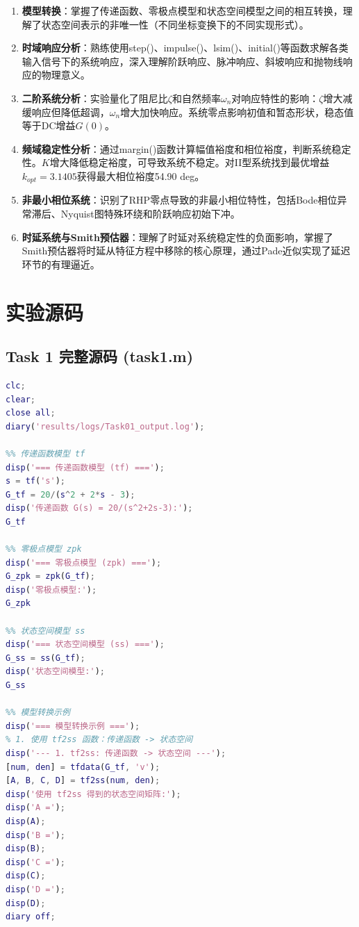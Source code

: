 \documentclass{../common/SCNU_Experimental_Report}
\begin{document}
\begin{enumerate}
    \item \textbf{模型转换}：掌握了传递函数、零极点模型和状态空间模型之间的相互转换，理解了状态空间表示的非唯一性（不同坐标变换下的不同实现形式）。

    \item \textbf{时域响应分析}：熟练使用step()、impulse()、lsim()、initial()等函数求解各类输入信号下的系统响应，深入理解阶跃响应、脉冲响应、斜坡响应和抛物线响应的物理意义。

    \item \textbf{二阶系统分析}：实验量化了阻尼比$\zeta$和自然频率$\omega_n$对响应特性的影响：$\zeta$增大减缓响应但降低超调，$\omega_n$增大加快响应。系统零点影响初值和暂态形状，稳态值等于DC增益$G(0)$。

    \item \textbf{频域稳定性分析}：通过margin()函数计算幅值裕度和相位裕度，判断系统稳定性。$K$增大降低稳定裕度，可导致系统不稳定。对II型系统找到最优增益$k_{opt}=3.1405$获得最大相位裕度54.90 deg。

    \item \textbf{非最小相位系统}：识别了RHP零点导致的非最小相位特性，包括Bode相位异常滞后、Nyquist图特殊环绕和阶跃响应初始下冲。

    \item \textbf{时延系统与Smith预估器}：理解了时延对系统稳定性的负面影响，掌握了Smith预估器将时延从特征方程中移除的核心原理，通过Pade近似实现了延迟环节的有理逼近。
\end{enumerate}

\section{实验源码}

\subsection*{Task 1 完整源码 (task1.m)}
\begin{lstlisting}[language=Matlab, caption=task1.m]
% Matlab 里控制系统的三种数学模型的转换
clc;
clear;
close all;
diary('results/logs/Task01_output.log');

%% 传递函数模型 tf
disp('=== 传递函数模型 (tf) ===');
s = tf('s');
G_tf = 20/(s^2 + 2*s - 3);
disp('传递函数 G(s) = 20/(s^2+2s-3):');
G_tf

%% 零极点模型 zpk
disp('=== 零极点模型 (zpk) ===');
G_zpk = zpk(G_tf);
disp('零极点模型:');
G_zpk

%% 状态空间模型 ss
disp('=== 状态空间模型 (ss) ===');
G_ss = ss(G_tf);
disp('状态空间模型:');
G_ss

%% 模型转换示例
disp('=== 模型转换示例 ===');
% 1. 使用 tf2ss 函数：传递函数 -> 状态空间
disp('--- 1. tf2ss: 传递函数 -> 状态空间 ---');
[num, den] = tfdata(G_tf, 'v');
[A, B, C, D] = tf2ss(num, den);
disp('使用 tf2ss 得到的状态空间矩阵:');
disp('A =');
disp(A);
disp('B =');
disp(B);
disp('C =');
disp(C);
disp('D =');
disp(D);
diary off;
\end{lstlisting}
\end{document}
